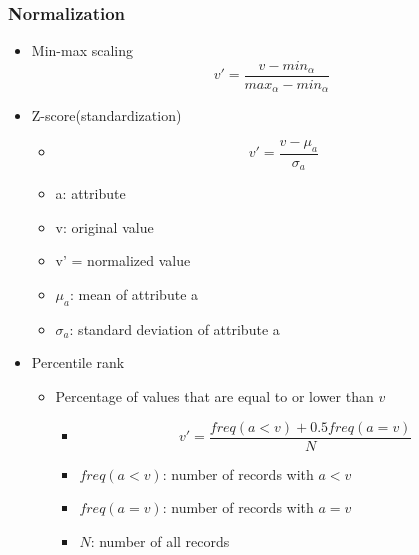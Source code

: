 \documentclass[../notes.tex]{subfiles}
\begin{document}
\subsubsection{Normalization}
\begin{itemize}
  \item Min-max scaling 
  $$v' = \frac{v - min_\alpha}{max_\alpha - min_\alpha}$$

  \item Z-score(standardization)
  \begin{itemize}
    \item $$v' = \frac{v - \mu_a}{\sigma_a}$$
    \item a: attribute
    \item v: original value
    \item v' = normalized value
    \item $\mu_a$: mean of attribute a
    \item $\sigma_a$: standard deviation of attribute a
  \end{itemize}

  \item Percentile rank
  \begin{itemize}
    \item Percentage of values that are equal to or lower than $v$
    \begin{itemize}
      \item $$v' = \frac{freq(a<v) + 0.5freq(a=v)}{N}$$
      \item $freq(a < v)$: number of records with $a < v$
      \item $freq(a = v)$: number of records with $a = v$
      \item $N$: number of all records
    \end{itemize}
  \end{itemize}
\end{itemize}
\end{document}
